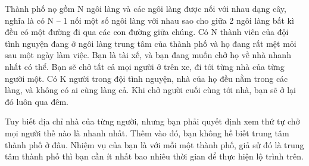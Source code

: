 Thành phố nọ gồm N ngôi làng và các ngôi làng được nối với nhau dạng cây, nghĩa là có N – 1 nối một số ngôi làng với nhau sao cho giữa 2 ngôi làng bất kì đều có một đường đi qua các con đường giữa chúng. Có N thành viên của đội tình nguyện đang ở ngôi làng trung tâm của thành phố và họ đang rất mệt mỏi sau một ngày làm việc. Bạn là tài xế, và bạn đang muốn chở họ về nhà nhanh nhất có thể. Bạn sẽ chở tất cả mọi người ở trên xe, đi tới từng nhà của từng người một. Có K người trong đội tình nguyện, nhà của họ đều nằm trong các làng, và không có ai cùng làng cả. Khi chở người cuối cùng tới nhà, bạn sẽ ở lại đó luôn qua đêm.  

   Tuy biết địa chỉ nhà của từng người, nhưng bạn phải quyết định xem thứ tự chở mọi người thế nào là nhanh nhất. Thêm vào đó, bạn không hề biết trung tâm thành phố ở đâu. Nhiệm vụ của bạn là với mỗi một thành phố, giả sử đó là trung tâm thành phố thì bạn cần ít nhất bao nhiêu thời gian để thực hiện lộ trình trên.